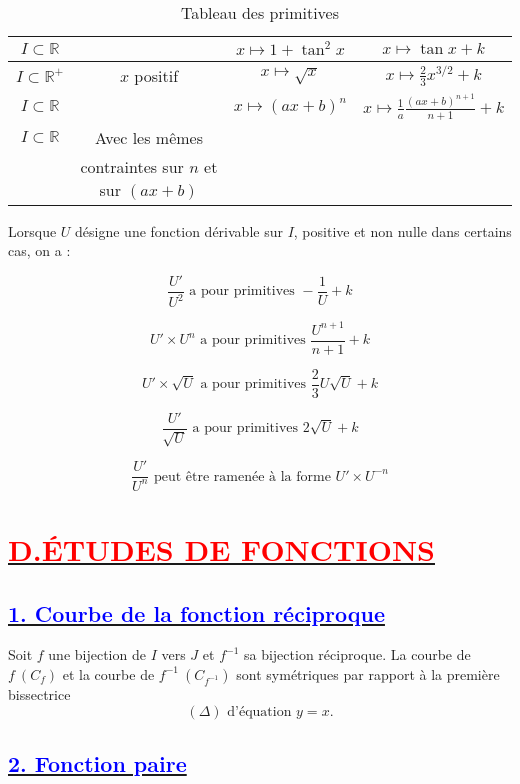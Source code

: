 \documentclass{article}
\begin{document}
\begin{table}[h!]
\begin{tabular}{|c|c|c|c|}
        \hline
        \( I \subset \mathbb{R} \) & & \( x \mapsto 1 + \tan^2 x \) & \( x \mapsto \tan x + k \) \\
        \hline
        \( I \subset \mathbb{R}^+ \) & \( x \) positif & \( x \mapsto \sqrt{x} \) & \( x \mapsto \frac{2}{3} x^{3/2} + k \) \\
        \hline
        \( I \subset \mathbb{R} \) & & \( x \mapsto (ax+b)^n \) & \( x \mapsto \frac{1}{a} \frac{(ax+b)^{n+1}}{n+1} + k \) \\
        \hline
        \( I \subset \mathbb{R} \) & Avec les mêmes & & \\
        & contraintes sur \( n \) et sur \( (ax+b) \) & & \\
        \hline
    \end{tabular}
    \caption{Tableau des primitives}
\end{table}

Lorsque $U$ désigne une fonction dérivable sur $I$, positive et non nulle dans certains cas, on a :

\[
\frac{U'}{U^2} \text{ a pour primitives } -\frac{1}{U} + k
\]

\[
U' \times U^n \text{ a pour primitives } \frac{U^{n+1}}{n+1} + k
\]

\[
U' \times \sqrt{U} \text{ a pour primitives } \frac{2}{3} U \sqrt{U} + k
\]

\[
\frac{U'}{\sqrt{U}} \text{ a pour primitives } 2 \sqrt{U} + k
\]

\[
\frac{U'}{U^n} \text{ peut être ramenée à la forme } U' \times U^{-n}
\]

\section*{\underline{\textbf{\textcolor{red}{D.ÉTUDES DE FONCTIONS}}}}
\subsection*{\underline{\textbf{\textcolor{blue}{1. Courbe de la fonction réciproque}}}}

Soit $f$ une bijection de $I$ vers $J$ et $f^{-1}$ sa bijection réciproque.  
La courbe de $f \ (C_f)$ et la courbe de $f^{-1} \ (C_{f^{-1}})$ sont symétriques par rapport à la première bissectrice  
\[
(\Delta) \text{ d'équation } y = x.
\]
\subsection*{\underline{\textbf{\textcolor{blue}{2. Fonction paire}}}}
\end{document}
